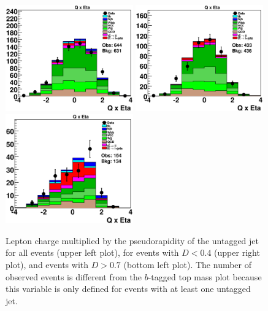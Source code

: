\begin{figure}[!h!tbp]
\includegraphics[width=0.49\textwidth]
{eps/MatrixElement/topovars/QTimesEta_0.eps}
\includegraphics[width=0.49\textwidth]
{eps/MatrixElement/topovars/QTimesEta_-0.4.eps}
\includegraphics[width=0.49\textwidth]
{eps/MatrixElement/topovars/QTimesEta_0.7.eps}
\vspace{-0.1in}
\caption{Lepton charge multiplied by the pseudorapidity of the untagged
jet for all events (upper left plot), for events with $D < 0.4$ (upper right
plot), and events with $D > 0.7$ (bottom left plot). The number of observed
events is different from the $b$-tagged top mass plot because this
variable is only defined for events with at least one untagged jet.}
\label{q-eta}
\end{figure}

